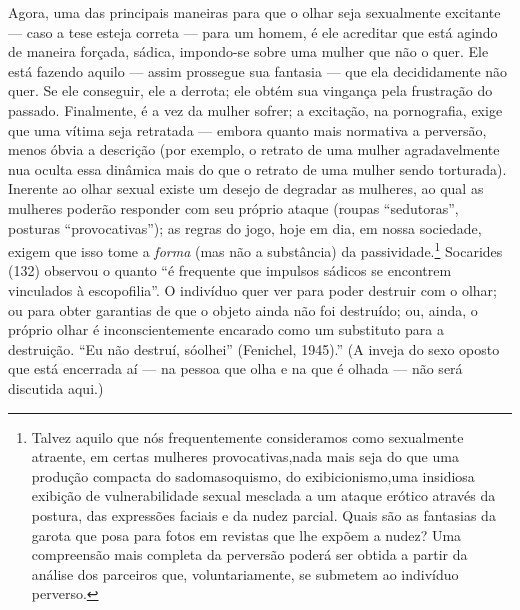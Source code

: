 Agora, uma das principais maneiras para que o olhar seja sexualmente
excitante --- caso a tese esteja correta --- para um homem, é ele
acreditar que está agindo de maneira forçada, sádica, impondo-se sobre
uma mulher que não o quer. Ele está fazendo aquilo --- assim prossegue
sua fantasia --- que ela decididamente não quer. Se ele conseguir, ele
a derrota; ele obtém sua vingança pela frustração do passado.
Finalmente, é a vez da mulher sofrer; a excitação, na pornografia,
exige que uma vítima seja retratada --- embora quanto mais normativa a
perversão, menos óbvia a descrição (por exemplo, o retrato de uma
mulher agradavelmente nua oculta essa dinâmica mais do que o retrato de
uma mulher sendo torturada). Inerente ao olhar sexual existe um desejo
de degradar as mulheres, ao qual as mulheres poderão responder com seu
próprio ataque (roupas\idxroup{} ``sedutoras'',
posturas ``provocativas''); as regras do
jogo, hoje em dia, em nossa sociedade, exigem que isso tome a
\textit{forma} (mas não a substância) da passividade.\footnote{ Talvez
aquilo que nós frequentemente consideramos como sexualmente atraente,
em certas mulheres provocativas,\idxroup[|nn] nada mais seja do que uma produção
compacta do sadomasoquismo, do exibicionismo,\idxexibiatra[|nn] uma insidiosa exibição de
vulnerabilidade sexual mesclada a um ataque erótico através da postura,
das expressões faciais e da nudez parcial. Quais são as fantasias da
garota que posa para fotos em revistas que lhe expõem a nudez? Uma
compreensão mais completa da perversão poderá ser obtida a partir da
análise dos parceiros que, voluntariamente, se submetem ao indivíduo
perverso.} Socarides\idxsocar{} (132) observou o quanto ``é
frequente que impulsos sádicos se encontrem vinculados à escopofilia''. O
indivíduo quer ver para poder destruir com o olhar; ou para obter
garantias de que o objeto ainda não foi destruído; ou, ainda, o próprio
olhar é inconscientemente encarado como um substituto para a
destruição. ``Eu não destruí, só\idxsadivoye[|)]
olhei'' (Fenichel,\idxfenic{} 1945).'' (A inveja do
sexo oposto que está encerrada aí --- na pessoa que olha e na que é
olhada --- não será discutida aqui.)

